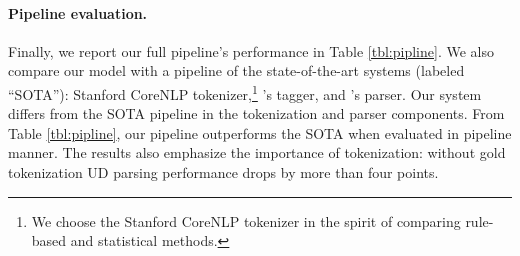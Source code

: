 \documentclass[11pt,a4paper]{article}
\newcommand{\yjcomment}[1]{\textcolor{orange}{[$_\mathrm{L}^\mathrm{Y}$#1]}}
\newcommand{\nascomment}[1]{\textcolor{blue}{[#1 ---\textsc{nas}]}}
\newcommand{\yicomment}[1]{\textcolor{gray}{[#1 ---\textsc{yi}]}}
\begin{document}
\paragraph{Pipeline evaluation.} Finally, we report  our full
pipeline's performance in  Table \ref{tbl:pipline}. We also compare
our model with a pipeline of the state-of-the-art systems (labeled  ``SOTA''):
Stanford CoreNLP tokenizer,\footnote{We choose the Stanford CoreNLP tokenizer in the spirit of comparing 
rule-based and statistical methods.} %
\citet{owoputi-EtAl:2013:NAACL-HLT}'s tagger, and \citet{dozat-qi-manning:2017:K17-3}'s parser.
Our system differs from the SOTA pipeline in the tokenization and parser components.
From Table \ref{tbl:pipline}, our pipeline outperforms the SOTA when
evaluated in pipeline manner.
The results also emphasize the
importance of tokenization:  without gold tokenization
UD parsing
performance drops by more than four points.
\end{document}
